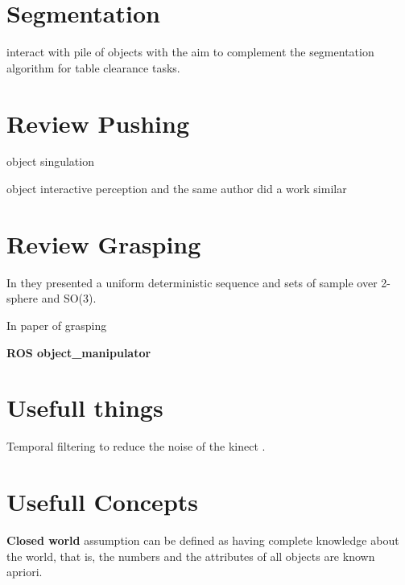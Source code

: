 \section{Segmentation}
\citep{katz2014perceiving} interact with pile of objects with the aim to complement the segmentation algorithm for table clearance tasks.

\section{Review Pushing}
\citep{conf/iros/HermansRB12} object singulation

\citep{katz2011interactive} object interactive perception and the same author did a work similar \citep{Katz_2013_7407} 

\citep{lynch1996stable}

\section{Review Grasping}
In \citep{DBLP:conf/icra/YershovaL04} they presented a uniform deterministic sequence and sets of sample over 2-sphere and SO(3).

In \cite{Dang-semantic-grasping} paper of grasping

\textbf{ROS object\_manipulator}

\section{Usefull things}
Temporal filtering to reduce the noise of the kinect	 \citep{SSS147762}.

\section{Usefull Concepts}
 \textbf{Closed world} assumption \citep{Reiter87} can be defined
as having complete knowledge about the world, that is, the numbers and the attributes
of all objects are known apriori. 

\iffalse

